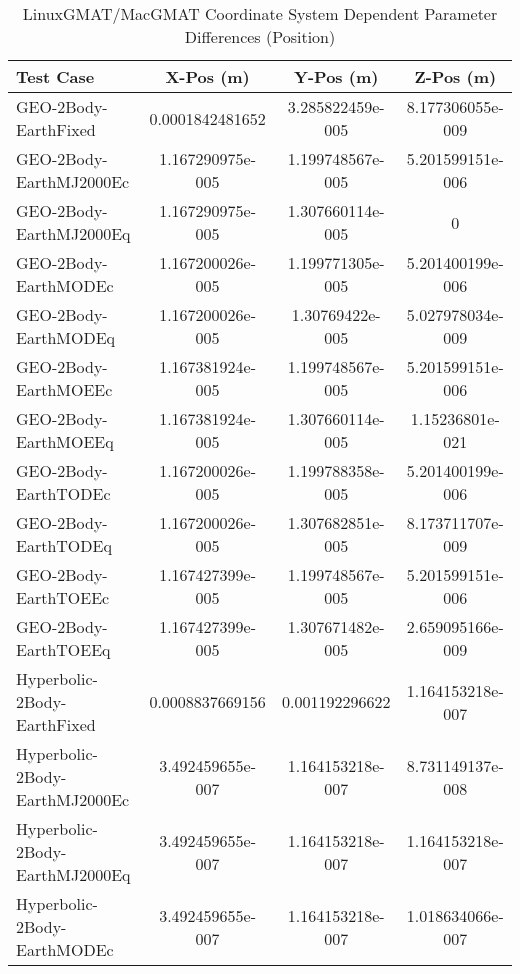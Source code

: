 \begin{table}[htbp!]
\centering
\caption{ LinuxGMAT/MacGMAT Coordinate System Dependent Parameter Differences (Position)}
      \begin{tabular}{lccc}
      \hline\hline
          Test Case & X-Pos (m) & Y-Pos (m) & Z-Pos (m) \\
         \hline
         GEO-2Body-EarthFixed & 0.0001842481652 & 3.285822459e-005 & 8.177306055e-009 \\
         GEO-2Body-EarthMJ2000Ec & 1.167290975e-005 & 1.199748567e-005 & 5.201599151e-006 \\
         GEO-2Body-EarthMJ2000Eq & 1.167290975e-005 & 1.307660114e-005 & 0 \\
         GEO-2Body-EarthMODEc & 1.167200026e-005 & 1.199771305e-005 & 5.201400199e-006 \\
         GEO-2Body-EarthMODEq & 1.167200026e-005 & 1.30769422e-005 & 5.027978034e-009 \\
         GEO-2Body-EarthMOEEc & 1.167381924e-005 & 1.199748567e-005 & 5.201599151e-006 \\
         GEO-2Body-EarthMOEEq & 1.167381924e-005 & 1.307660114e-005 & 1.15236801e-021 \\
         GEO-2Body-EarthTODEc & 1.167200026e-005 & 1.199788358e-005 & 5.201400199e-006 \\
         GEO-2Body-EarthTODEq & 1.167200026e-005 & 1.307682851e-005 & 8.173711707e-009 \\
         GEO-2Body-EarthTOEEc & 1.167427399e-005 & 1.199748567e-005 & 5.201599151e-006 \\
         GEO-2Body-EarthTOEEq & 1.167427399e-005 & 1.307671482e-005 & 2.659095166e-009 \\
         Hyperbolic-2Body-EarthFixed & 0.0008837669156 & 0.001192296622 & 1.164153218e-007 \\
         Hyperbolic-2Body-EarthMJ2000Ec & 3.492459655e-007 & 1.164153218e-007 & 8.731149137e-008 \\
         Hyperbolic-2Body-EarthMJ2000Eq & 3.492459655e-007 & 1.164153218e-007 & 1.164153218e-007 \\
         Hyperbolic-2Body-EarthMODEc & 3.492459655e-007 & 1.164153218e-007 & 1.018634066e-007 \\

\end{tabular}
\end{table}
